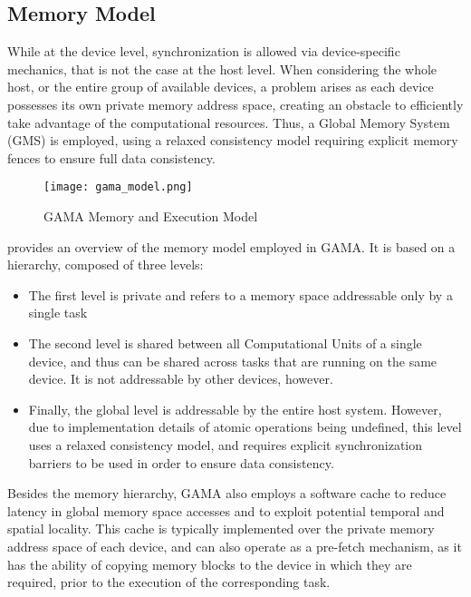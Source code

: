 \subsection{Memory Model}

While at the device level, synchronization is allowed via device-specific mechanics, that is not the case at the host level. When considering the whole host, or the entire group of available devices, a problem arises as each device possesses its own private memory address space, creating an obstacle to efficiently take advantage of the computational resources. Thus, a Global Memory System (GMS) is employed, using a relaxed consistency model requiring explicit memory fences to ensure full data consistency. 

\begin{figure}[!htp]
  \centering
  \texttt{[image: gama\_model.png]}
  \caption{GAMA Memory and Execution Model}
  \label{fig:upem}
\end{figure}

 provides an overview of the memory model employed in GAMA. It is based on a hierarchy, composed of three levels:
\begin{itemize}
  \item The first level is private and refers to a memory space addressable only by a single task
  \item The second level is shared between all Computational Units of a single device, and thus can be shared across tasks that are running on the same device. It is not addressable by other devices, however.
  \item Finally, the global level is addressable by the entire host system. However, due to implementation details of atomic operations being undefined, this level uses a relaxed consistency model, and requires explicit synchronization barriers to be used in order to ensure data consistency. 
\end{itemize}

Besides the memory hierarchy, GAMA also employs a software cache to reduce latency in global memory space accesses and to exploit potential temporal and spatial locality. This cache is typically implemented over the private memory address space of each device, and can also operate as a pre-fetch mechanism, as it has the ability of copying memory blocks to the device in which they are required, prior to the execution of the corresponding task.
